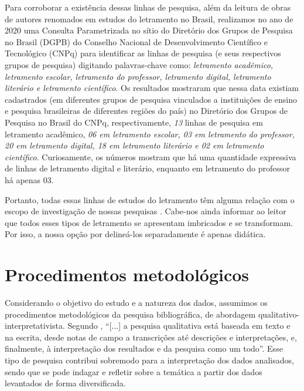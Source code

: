 \documentclass{textolivre}
\begin{document}
Para corroborar a existência dessas linhas de pesquisa, além da leitura de obras de autores renomados em estudos do letramento no Brasil, realizamos no ano de 2020 uma Consulta Parametrizada no sítio do Diretório dos Grupos de Pesquisa no Brasil (DGPB) do Conselho Nacional de Desenvolvimento Científico e Tecnológico (CNPq) para identificar as linhas de pesquisa (e seus respectivos grupos de pesquisa) digitando palavras-chave como: \textit{letramento acadêmico, letramento escolar, letramento do professor, letramento digital, letramento literário e letramento científico}. Os resultados mostraram que nessa data existiam cadastrados (em diferentes grupos de pesquisa vinculados a instituições de ensino e pesquisa brasileiras de diferentes regiões do país) no Diretório dos Grupos de Pesquisa no Brasil do CNPq, respectivamente, \textit{13} linhas de pesquisa em letramento acadêmico, \textit{06 em letramento escolar, 03 em letramento do professor, 20 em letramento digital, 18 em letramento literário e 02 em letramento científico}. Curiosamente, os números mostram que há uma quantidade expressiva de linhas de letramento digital e literário, enquanto em letramento do professor há apenas 03. 

Portanto, todas essas linhas de estudos do letramento têm alguma relação com o escopo de investigação de nossas pesquisas \cite{goncalves_nas_2011, goncalves_interacao_2013, silva_pedagogia_2018, silva_formacao_2019, silva_plano_2020, santos_letramento_2020}. Cabe-nos ainda informar ao leitor que todos esses tipos de letramento se apresentam imbricados e se transformam. Por isso, a nossa opção por delineá-los separadamente é apenas didática.

\section{Procedimentos metodológicos}\label{sec-metodologia}
Considerando o objetivo do estudo e a natureza dos dados, assumimos os procedimentos metodológicos da pesquisa bibliográfica, de abordagem qualitativo-interpretativista. Segundo \textcite[p. 9]{flick_introduco_2009}, “[...] a pesquisa qualitativa está baseada em texto e na escrita, desde notas de campo a transcrições até descrições e interpretações, e, finalmente, à interpretação dos resultados e da pesquisa como um todo”. Esse tipo de pesquisa contribui sobremodo para a interpretação dos dados analisados, sendo que se pode indagar e refletir sobre a temática a partir dos dados levantados de forma diversificada.
\end{document}
